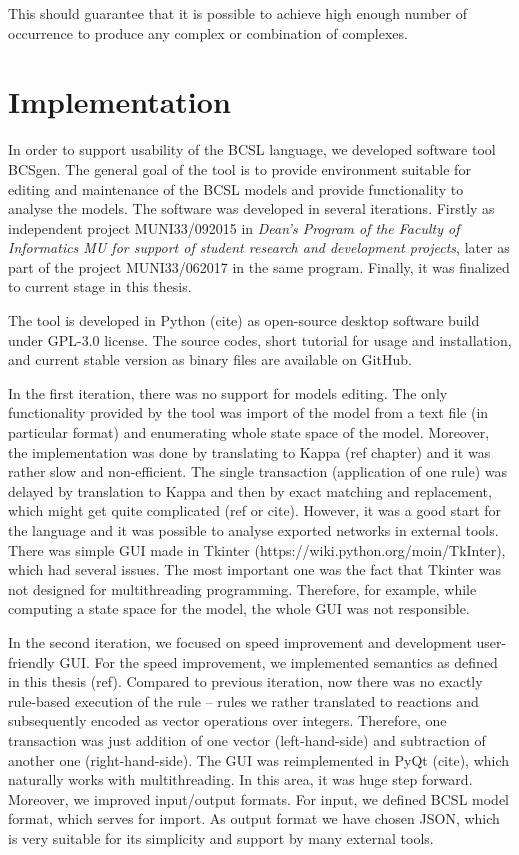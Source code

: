 \documentclass[12pt]{fithesis2}
\begin{document}
This should guarantee that it is possible to achieve high enough number of occurrence to produce any complex or combination of complexes.

\chapter{Implementation}

In order to support usability of the BCSL language, we developed software tool BCSgen. The general goal of the tool is to provide environment suitable for editing and maintenance of the BCSL models and provide functionality to analyse the models. The software was developed in several iterations. Firstly as independent project MUNI33/092015 in \emph{Dean's Program of the Faculty of Informatics MU for support of student research and development projects}, later as part of the project MUNI33/062017 in the same program. Finally, it was finalized to current stage in this thesis.

The tool is developed in Python (cite) as open-source desktop software build under GPL-3.0 license. The source codes, short tutorial for usage and installation, and current stable version as binary files are available on GitHub\footnotemark[1].

In the first iteration, there was no support for models editing. The only functionality provided by the tool was import of the model from a text file (in particular format) and enumerating whole state space of the model. Moreover, the implementation was done by translating to Kappa (ref chapter) and it was rather slow and non-efficient. The single transaction (application of one rule) was delayed by translation to Kappa and then by exact matching and replacement, which might get quite complicated (ref or cite). However, it was a good start for the language and it was possible to analyse exported networks in external tools. There was simple GUI made in Tkinter (https://wiki.python.org/moin/TkInter), which had several issues. The most important one was the fact that Tkinter was not designed for multithreading programming. Therefore, for example, while computing a state space for the model, the whole GUI was not responsible.

In the second iteration, we focused on speed improvement and development user-friendly GUI. For the speed improvement, we implemented semantics as defined in this thesis (ref). Compared to previous iteration, now there was no exactly rule-based execution of the rule -- rules we rather translated to reactions and subsequently encoded as vector operations over integers. Therefore, one transaction was just addition of one vector (left-hand-side) and subtraction of another one (right-hand-side). The GUI was reimplemented in PyQt (cite), which naturally works with multithreading. In this area, it was huge step forward. Moreover, we improved input/output formats. For input, we defined BCSL model format, which serves for import. As output format we have chosen JSON, which is very suitable for its simplicity and support by many external tools.
\end{document}
